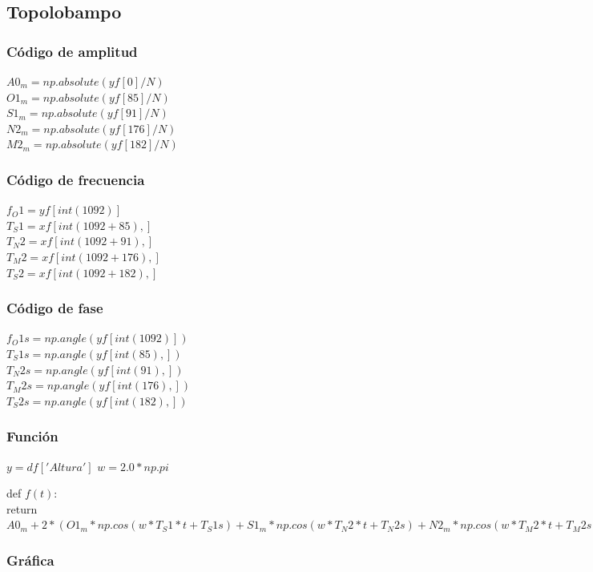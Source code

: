 \documentclass[a4paper,12pt]{article}
\begin{document}
\subsection{Topolobampo}
\subsubsection{Código de amplitud}
\noindent
$A0_m = np.absolute(yf[0]/N)$\\
$O1_m = np.absolute(yf[85]/N)$\\
$S1_m = np.absolute(yf[91]/N)$\\
$N2_m = np.absolute(yf[176]/N)$\\
$M2_m = np.absolute(yf[182]/N)$

\subsubsection{Código de frecuencia}
\noindent
$f_O1 = yf[int(1092)]$\\
$T_S1 = xf[int(1092+85),]$\\
$T_N2 = xf[int(1092+91),]$\\
$T_M2 = xf[int(1092+176),]$\\
$T_S2 = xf[int(1092+182),]$

\subsubsection{Código de fase}
\noindent
$f_O1s = np.angle(yf[int(1092)])$\\
$T_S1s = np.angle(yf[int(85),])$\\
$T_N2s = np.angle(yf[int(91),])$\\
$T_M2s = np.angle(yf[int(176),])$\\
$T_S2s = np.angle(yf[int(182),])$

\subsubsection{Función}
\noindent
$y= df['Altura']$
$w= 2.0*np.pi$

def $f(t):$\\
    return $A0_m + 2*(O1_m*np.cos(w*T_S1*t+T_S1s) + S1_m*np.cos(w * T_N2 *t+T_N2s) + N2_m*np.cos(w*T_M2*t+T_M2s) 
+ M2_m*np.cos(w*T_S2*t+T_S2s))$

\newpage
\subsubsection{Gráfica}
\end{document}
